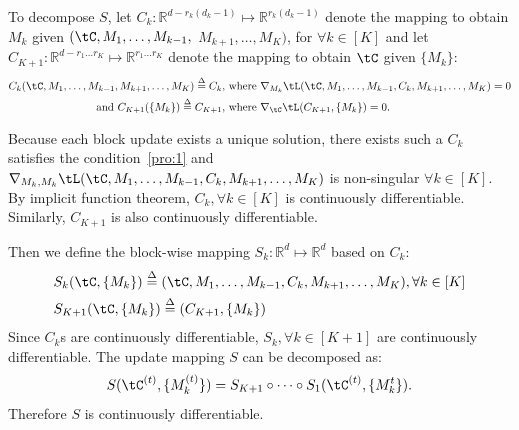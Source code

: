 \documentclass[11pt]{article}
\begin{document}
To decompose $S$, let $C_k: \mathbb{R}^{d - r_k(d_k - 1)} \mapsto \mathbb{R}^{r_k(d_k -1)}$ denote the mapping to obtain $M_k$ given $(\tC, M_1, \dots, M_{k-1},$ $ M_{k+1},\dots, M_{K})$, for $\forall k \in [K]$ and let $C_{K+1}:  \mathbb{R}^{d - r_1 \dots r_K} \mapsto \mathbb{R}^{r_1 \dots r_K}$ denote the mapping to obtain $\tC$ given $\{M_k\}$:
\begin{align}
	 C_k (\tC, M_1, \dots, M_{k-1}, M_{k+1},\dots, M_{K}) \overset{\Delta}{=}C_k
	 ,&\text{ where } \nabla_{M_k} \tL( \tC, M_1, \dots, M_{k-1},C_k, M_{k+1},\dots, M_{K}) = 0 \label{pro:1} \\
	\text{ and } C_{K+1} (\{M_k\}) \overset{\Delta}{=} C_{K+1} , &\text{ where }   \nabla_{\tC} \tL( C_{K+1}, \{M_k\}) = 0. \notag
\end{align}

Because each block update exists a unique solution, there exists such a $C_k$ satisfies the condition~\ref{pro:1}  and $\nabla_{M_k,M_k} \tL( \tC, M_1, \dots, M_{k-1},C_k, M_{k+1},\dots, M_{K})$ is non-singular $ \forall k \in [K]$. By implicit function theorem, $C_k, \forall k \in [K]$ is continuously differentiable. Similarly, $C_{K+1}$ is also continuously differentiable.

Then we define the block-wise mapping $S_k: \mathbb{R}^{d} \mapsto \mathbb{R}^{d} $ based on $C_k$:
\begin{align*}
	&S_k(\tC, \{M_k\}) \overset{\Delta}{=}  (\tC, M_1, \dots, M_{k-1}, C_k ,M_{k+1},\dots, M_{K}), \forall k \in [K] \\
	& S_{K+1} (\tC,\{M_k\}) \overset{\Delta}{=} (C_{K+1},\{M_k\})
\end{align*}
Since $C_k$s are continuously differentiable,  $S_k, \forall k \in [K+1]$ are continuously differentiable. The update mapping $S$ can be decomposed as:
\begin{align*}
	S(\tC^{(t)}, \{M^{(t)}_k\}) = S_{K+1}\circ \dots \circ S_1 (\tC^{(t)}, \{M^{t}_k\}).
\end{align*}
Therefore $S$ is continuously differentiable.
\end{document}
